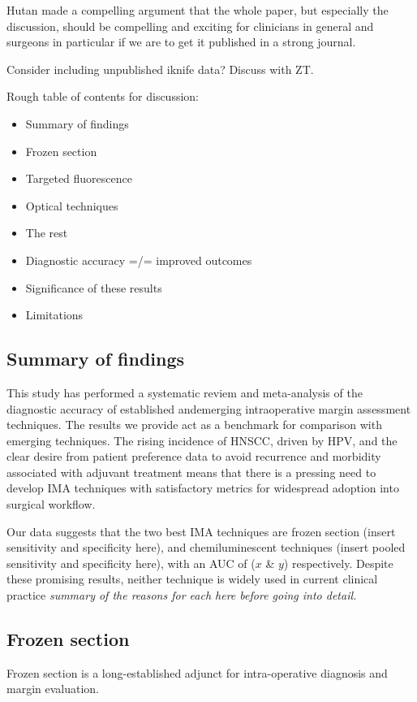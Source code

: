 Hutan made a compelling argument that the whole paper, but especially the discussion, should be compelling and exciting for clinicians in general and surgeons in particular if we are to get it published in a strong journal.

Consider including unpublished iknife data? Discuss with ZT.

Rough table of contents for discussion:
\begin{itemize}
\item Summary of findings
\item Frozen section
\item Targeted fluorescence
\item Optical techniques
\item The rest
\item Diagnostic accuracy =/= improved outcomes
\item Significance of these results
\item Limitations
\end{itemize}

\subsection{Summary of findings}

This study has performed a systematic reviem and meta-analysis of the diagnostic accuracy of established andemerging intraoperative margin assessment techniques.
The results we provide act as a benchmark for comparison with emerging techniques.
The rising incidence of HNSCC, driven by HPV, and the clear desire from patient preference data to avoid recurrence and morbidity associated with adjuvant treatment means that there is a pressing need to develop IMA techniques with satisfactory metrics for widespread adoption into surgical workflow.

Our data suggests that the two best IMA techniques are frozen section (insert sensitivity and specificity here), and chemiluminescent techniques (insert pooled sensitivity and specificity here), with an AUC of ($x$ \& $y$) respectively.
Despite these promising results, neither technique is widely used in current clinical practice
\emph{summary of the reasons for each here before going into detail.}

\subsection{Frozen section}

Frozen section is a long-established adjunct for intra-operative diagnosis and margin evaluation.

